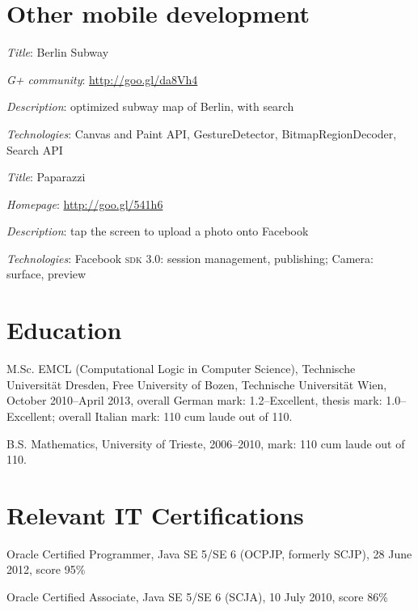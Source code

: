 \documentclass[letterpaper]{article}
\renewenvironment{itemize}{
  \begin{list}{}{
    \setlength{\leftmargin}{1.5em}
  }
}{
  \end{list}
}
\begin{document}
\section*{Other mobile development}
\begin{itemize}
	\item
	\begin{itemize} 
	    \item {\it Title}: Berlin Subway
	    \item {\it G+ community}: \url{http://goo.gl/da8Vh4}
	    \item {\it Description}: optimized subway map of Berlin, with search
	    \item {\it Technologies}: Canvas and Paint API, GestureDetector, BitmapRegionDecoder, Search API
	\end{itemize}
    \item
	\begin{itemize}
	      \item {\it Title}: Paparazzi
	      \item {\it Homepage}: \url{http://goo.gl/541h6}
	      \item {\it Description}: tap the screen to upload a photo onto Facebook
	      \item {\it Technologies}: Facebook \textsc{sdk} 3.0: session management, publishing; Camera: surface, preview       
	\end{itemize}           
\end{itemize}


\section*{Education}
\begin{itemize}
  \item M.Sc. EMCL (Computational Logic in Computer Science), Technische Universit\"{a}t Dresden, Free University of Bozen, Technische Universit\"{a}t Wien, October 2010--April 2013, overall German mark: 1.2--Excellent, thesis mark: 1.0--Excellent; overall Italian mark: 110 cum laude out of 110.

  \item B.S. Mathematics, University of Trieste, 2006--2010, mark: 110 cum laude out of 110. 
\end{itemize}

\section*{Relevant IT Certifications}
\begin{itemize}
\item Oracle Certified Programmer, Java SE 5/SE 6 (OCPJP, formerly SCJP), 28 June 2012, score 95\%
\item Oracle Certified Associate, Java SE 5/SE 6 (SCJA), 10 July 2010, score 86\%
\end{itemize}
\end{document}
